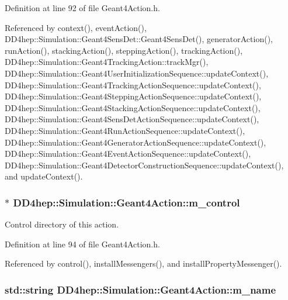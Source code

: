 Definition at line 92 of file Geant4Action.h.

Referenced by context(), eventAction(), DD4hep::Simulation::Geant4SensDet::Geant4SensDet(), generatorAction(), runAction(), stackingAction(), steppingAction(), trackingAction(), DD4hep::Simulation::Geant4TrackingAction::trackMgr(), DD4hep::Simulation::Geant4UserInitializationSequence::updateContext(), DD4hep::Simulation::Geant4TrackingActionSequence::updateContext(), DD4hep::Simulation::Geant4SteppingActionSequence::updateContext(), DD4hep::Simulation::Geant4StackingActionSequence::updateContext(), DD4hep::Simulation::Geant4SensDetActionSequence::updateContext(), DD4hep::Simulation::Geant4RunActionSequence::updateContext(), DD4hep::Simulation::Geant4GeneratorActionSequence::updateContext(), DD4hep::Simulation::Geant4EventActionSequence::updateContext(), DD4hep::Simulation::Geant4DetectorConstructionSequence::updateContext(), and updateContext().\hypertarget{class_d_d4hep_1_1_simulation_1_1_geant4_action_aff23910feb64988b85e08b1faff251f4}{
\subsubsection[{m\_\-control}]{$\ast$ {\bf DD4hep::Simulation::Geant4Action::m\_\-control}}}
\label{class_d_d4hep_1_1_simulation_1_1_geant4_action_aff23910feb64988b85e08b1faff251f4}


Control directory of this action. 

Definition at line 94 of file Geant4Action.h.

Referenced by control(), installMessengers(), and installPropertyMessenger().\hypertarget{class_d_d4hep_1_1_simulation_1_1_geant4_action_adb04332ff4e52bce5b9ae1a5848b5d5e}{
\subsubsection[{m\_\-name}]{\setlength{\rightskip}{0pt plus 5cm}std::string {\bf DD4hep::Simulation::Geant4Action::m\_\-name}}}
\label{class_d_d4hep_1_1_simulation_1_1_geant4_action_adb04332ff4e52bce5b9ae1a5848b5d5e}


